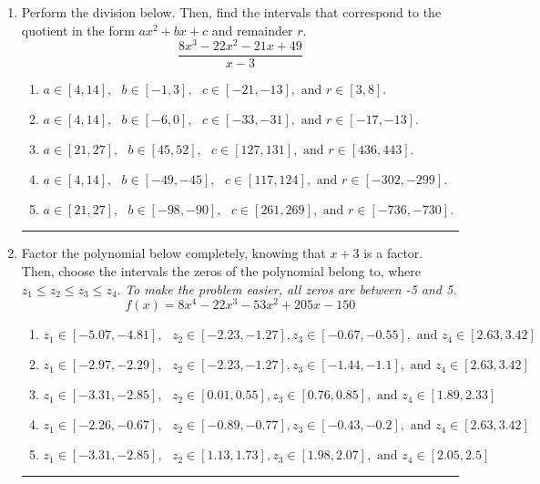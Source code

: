 \documentclass[14pt]{extbook}
\newcommand{\litem}[1]{\item#1\hspace*{-1cm}\rule{\textwidth}{0.4pt}}
\begin{document}
\begin{enumerate}
{\begin{enumerate}[label=\Alph*.]
\end{enumerate} }
\litem{
Perform the division below. Then, find the intervals that correspond to the quotient in the form $ax^2+bx+c$ and remainder $r$.\[ \frac{8x^{3} -22 x^{2} -21 x + 49}{x -3} \]\begin{enumerate}[label=\Alph*.]
\item \( a \in [4, 14], \text{   } b \in [-1, 3], \text{   } c \in [-21, -13], \text{   and   } r \in [3, 8]. \)
\item \( a \in [4, 14], \text{   } b \in [-6, 0], \text{   } c \in [-33, -31], \text{   and   } r \in [-17, -13]. \)
\item \( a \in [21, 27], \text{   } b \in [45, 52], \text{   } c \in [127, 131], \text{   and   } r \in [436, 443]. \)
\item \( a \in [4, 14], \text{   } b \in [-49, -45], \text{   } c \in [117, 124], \text{   and   } r \in [-302, -299]. \)
\item \( a \in [21, 27], \text{   } b \in [-98, -90], \text{   } c \in [261, 269], \text{   and   } r \in [-736, -730]. \)

\end{enumerate} }
\litem{
Factor the polynomial below completely, knowing that $x+3$ is a factor. Then, choose the intervals the zeros of the polynomial belong to, where $z_1 \leq z_2 \leq z_3 \leq z_4$. \textit{To make the problem easier, all zeros are between -5 and 5.}\[ f(x) = 8x^{4} -22 x^{3} -53 x^{2} +205 x -150 \]\begin{enumerate}[label=\Alph*.]
\item \( z_1 \in [-5.07, -4.81], \text{   }  z_2 \in [-2.23, -1.27], z_3 \in [-0.67, -0.55], \text{   and   } z_4 \in [2.63, 3.42] \)
\item \( z_1 \in [-2.97, -2.29], \text{   }  z_2 \in [-2.23, -1.27], z_3 \in [-1.44, -1.1], \text{   and   } z_4 \in [2.63, 3.42] \)
\item \( z_1 \in [-3.31, -2.85], \text{   }  z_2 \in [0.01, 0.55], z_3 \in [0.76, 0.85], \text{   and   } z_4 \in [1.89, 2.33] \)
\item \( z_1 \in [-2.26, -0.67], \text{   }  z_2 \in [-0.89, -0.77], z_3 \in [-0.43, -0.2], \text{   and   } z_4 \in [2.63, 3.42] \)
\item \( z_1 \in [-3.31, -2.85], \text{   }  z_2 \in [1.13, 1.73], z_3 \in [1.98, 2.07], \text{   and   } z_4 \in [2.05, 2.5] \)


\end{enumerate}}
\end{enumerate}
\end{document}
